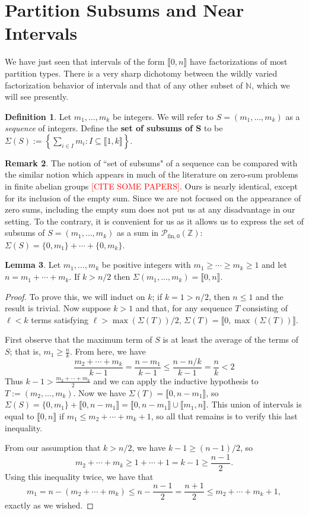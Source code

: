 \documentclass{report}
\newcommand{\NN}{\mathbb{N}}
\renewcommand{\P}{\mathcal{P}}
\newcommand{\ZZ}{\mathbb{Z}}
\newcommand{\llb}{\llbracket}
\newcommand{\rrb}{\rrbracket}
\newcommand{\fon}{{\textrm{fin}, 0}}
\renewcommand{\:}{\text{:}}
\theoremstyle{definition}
\newtheorem{defn}{Definition}[section]
\newtheorem{lemma}[defn]{Lemma}
\newtheorem{rk}[defn]{Remark}
\begin{document}
\section{Partition Subsums and Near Intervals}
We have just seen that intervals of the form $\llb 0,n \rrb$ have factorizations of most partition types.
There is a very sharp dichotomy between the wildly varied factorization behavior of intervals and that of any other subset of $\NN$, which we will see presently.  

\begin{defn}
Let $m_1,\dots, m_k$ be integers.
We will refer to $S = (m_1,\dots, m_k)$ as a \textit{sequence} of integers.
Define the \textbf{set of subsums of S} to be $\Sigma(S) := \left\{ \sum_{i\in I} m_i : I\subseteq \llb 1,k \rrb \right\}$.
\end{defn}

\begin{rk}
The notion of ``set of subsums" of a sequence can be compared with the similar notion which appears in much of the literature on zero-sum problems in finite abelian groups \textcolor{red}{[CITE SOME PAPERS]}.  
Ours is nearly identical, except for its inclusion of the empty sum.
Since we are not focused on the appearance of zero sums, including the empty sum does not put us at any disadvantage in our setting.
To the contrary, it is convenient for us as it allows us to express the set of subsums of $S = (m_1,\dots, m_k)$ as a sum in $\P_\fon(\ZZ)$: $\Sigma(S)  = \{0,m_1\} + \cdots +\{0,m_k\}$.
\end{rk}

\begin{lemma} \label{lem:long-partitions}
Let $m_1,\dots, m_k$ be positive integers with $m_1\ge \cdots \ge m_k \ge 1$ and let $n = m_1 + \cdots + m_k$.
If $k> n/2$ then $\Sigma(m_1,\dots, m_k) = \llb 0,n \rrb$.
\end{lemma}

\begin{proof}
To prove this, we will induct on $k$; if $k=1 > n/2$, then $n \le 1$ and the result is trivial.
Now suppose $k > 1$ and that, for any sequence $T$ consisting of $\ell < k$ terms satisfying $\ell > \max(\Sigma(T))/2$, $\Sigma(T) = \llb 0, \max(\Sigma(T)) \rrb$.

First observe that the maximum term of $S$ is at least the average of the terms of $S$; that is, $m_1 \ge \frac{n}{k}$.
From here, we have
\[ \frac{m_2+\cdots + m_k}{k-1} = \frac{n-m_1}{k-1} \le \frac{n-n/k}{k-1} = \frac{n}{k} < 2 \]
Thus $k - 1 > \frac{m_2+\cdots+m_k}{2}$ and we can apply the inductive hypothesis to $T := (m_2,\dots, m_k)$.
Now we have $\Sigma(T) = \llb 0, n-m_1 \rrb$, so $\Sigma(S) = \{0,m_1\} + \llb 0,n-m_1 \rrb = \llb 0,n-m_1 \rrb \cup \llb m_1,n \rrb$.
This union of intervals is equal to $\llb 0,n \rrb$ if $m_1 \le m_2 + \cdots + m_k +1$, so all that remains is to verify this last inequality.

From our assumption that $k > n/2$, we have $k-1 \ge (n-1)/2$, so 
\[m_2 + \cdots + m_k \ge 1 +\cdots + 1 = k-1 \ge \frac{n-1}{2}.\]
Using this inequality twice, we have that
\[m_1 = n - (m_2 + \cdots + m_k) \le n - \frac{n-1}{2} = \frac{n+1}{2} \le m_2 + \cdots + m_k + 1,\]
exactly as we wished.
\end{proof}
\end{document}
